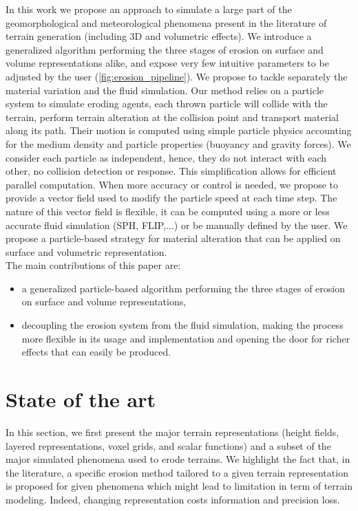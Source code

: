 In this work we propose an approach to simulate a large part of the geomorphological and meteorological phenomena present in the literature of terrain generation (including 3D and volumetric effects). We introduce a generalized algorithm performing the three stages of erosion on surface and volume representations alike, and expose very few intuitive parameters to be adjusted by the user (\cref{fig:erosion_pipeline}).
We propose to tackle separately the material variation and the fluid simulation. Our method relies on a particle system to simulate eroding agents, each thrown particle will collide with the terrain, perform terrain alteration at the collision point and transport material along its path. 
Their motion is computed using simple particle physics accounting for the medium density and particle properties (buoyancy and gravity forces). We consider each particle as independent, hence, they do not interact with each other, no collision detection or response. This simplification allows for efficient parallel computation. 
When more accuracy or control is needed, we propose to provide a vector field used to modify the particle speed at each time step. The nature of this vector field is flexible, it can be computed using a more or less accurate fluid simulation (SPH, FLIP,...) or be manually defined by the user. We propose a particle-based strategy for material alteration that can be applied on surface and volumetric representation. \\
The main contributions of this paper are: 
\begin{itemize}
\item a generalized particle-based algorithm performing the three
stages of erosion on surface and volume representations,
\item decoupling the erosion system from the fluid simulation, making the process more flexible in its usage and implementation and opening the door for richer effects that can easily be produced.
\end{itemize}
\section{State of the art}
\label{sec:erosion_state_of_the_art}
In this section, we first present the major terrain representations (height fields, layered representations, voxel grids, and scalar functions) and a subset of the major simulated phenomena used to erode terrains. We highlight the fact that, in the literature, a specific erosion method tailored to a given terrain representation is proposed for given phenomena which might lead to limitation in term of terrain modeling. Indeed, changing representation costs information and precision loss.
